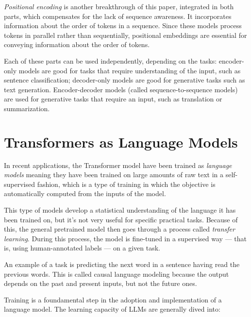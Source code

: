 \textit{Positional encoding} is another breakthrough of this paper, integrated in both parts, which compensates for the lack of sequence awareness. It incorporates information about the order of tokens in a sequence. Since these models process tokens in parallel rather than sequentially, positional embeddings are essential for conveying information about the order of tokens.

Each of these parts can be used independently, depending on the tasks: encoder-only models are good for tasks that require understanding of the input, such as sentence classification; decoder-only models are good for generative tasks such as text generation.
Encoder-decoder models (called sequence-to-sequence models) are used for generative tasks that require an input, such as translation or summarization.




\section{Transformers as Language Models}
In recent applications, the Transformer model have been trained as \textit{language models} meaning they have been trained on large amounts of raw text in a self-supervised fashion, which is a type of training in which the objective is automatically computed from the inputs of the model.

This type of models develop a statistical understanding of the language it has been trained on, but it’s not very useful for specific practical tasks. Because of this, the general pretrained model then goes through a process called \textit{transfer learning}. During this process, the model is fine-tuned in a supervised way — that is, using human-annotated labels — on a given task.

An example of a task is predicting the next word in a sentence having read the previous words. This is called causal language modeling because the output depends on the past and present inputs, but not the future ones.

Training is a foundamental step in the adoption and implementation of a language model. The learning capacity of LLMs are generally dived into:\cite{liu2024understanding}

